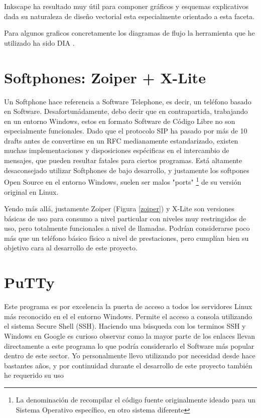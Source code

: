 Inkscape \cite{website:inkscape} ha resultado muy útil para componer gráficos y esquemas explicativos dada su naturaleza de diseño vectorial esta especialmente orientado a esta faceta.

Para algunos graficos concretamente los diagramas de flujo la herramienta que he utilizado ha sido DIA \cite{website:dia}.


\section*{Softphones: Zoiper + X-Lite}

Un Softphone hace referencia a Software Telephone, es decir, un teléfono basado en Software. Desafortunádamente, debo decir que en contrapartida, trabajando en un entorno Windows, estos en formato Software de Código Libre no son especialmente funcionales. Dado que el protocolo SIP ha pasado por más de 10 drafts antes de convertirse en un RFC medianamente estandarizado, existen muchas implementaciones y disposiciones espécificas en el intercambio de mensajes, que pueden resultar fatales para ciertos programas. Está altamente desaconsejado utilizar Softphones de bajo desarrollo, y justamente los softpones Open Source en el entorno Windows, suelen ser malos "ports" \footnote{La denominación de recompilar el código fuente originalmente ideado para un Sistema Operativo específico, en otro sistema diferente} de su versión original en Linux.

Yendo más allá, justamente Zoiper \cite{website:zoiper} (Figura \ref{zoiper}) y X-Lite \cite{website:xlite} son versiones básicas de uso para consumo a nivel particular con niveles muy restringidos de uso, pero totalmente funcionales a nivel de llamadas. Podrían considerarse poco más que un teléfono básico físico a nivel de prestaciones, pero cumplían bien su objetivo cara al desarrollo de este proyecto.


\section*{PuTTy}

Este programa es por excelencia la puerta de acceso a todos los servidores Linux más reconocido en el el entorno Windows. Permite el acceso a consola utilizando el sistema Secure Shell (SSH). Haciendo una búsqueda con los terminos SSH y Windows en Google es curioso observar como la mayor parte de los enlaces llevan directamente a este programa lo que podría considerarlo el Software más popular dentro de este sector. Yo personalmente llevo utilizando por necesidad desde hace bastantes años, y por continuidad durante el desarrollo de este proyecto también he requerido su uso

